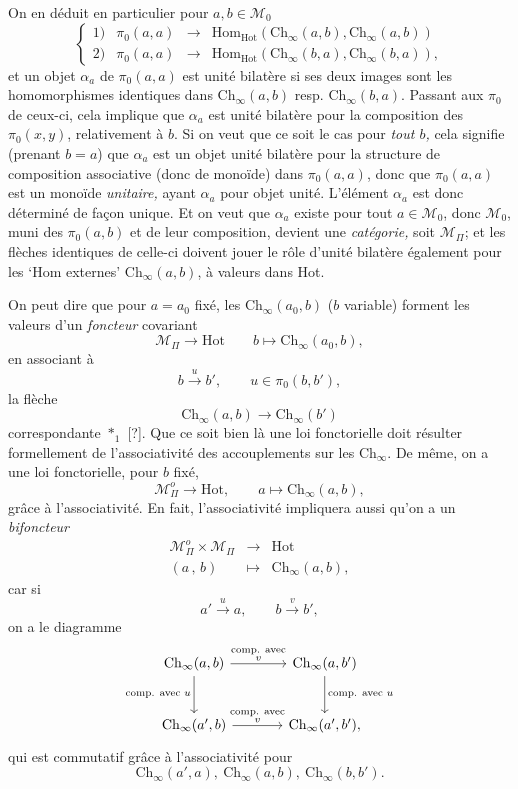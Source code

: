 \documentclass[11pt]{article}
\newcommand{\printedpage}[1]{\marginpar{\footnotesize p.~#1}}
\newcommand{\msp}[1]{\marginpar{\footnotesize [#1]}}
\newcommand{\Ch}{\mathrm{Ch}}
\newcommand{\Hot}{\mathrm{Hot}}
\newcommand{\Hom}{\mathrm{Hom}}
\begin{document}
On en déduit en particulier pour $a,b \in \mathcal{M}_0$
\[
\left\{
\begin{array}{cccc}
1) & \pi_0(a,a) & \longrightarrow & \Hom_{\Hot}(\Ch_\infty(a,b),\Ch_\infty(a,b)) \\[1ex]
2) & \pi_0(a,a) & \longrightarrow & \Hom_{\Hot}(\Ch_\infty(b,a),\Ch_\infty(b,a)),
\end{array}
\right.
\tag*{$(*)$}
\]
et un objet $\alpha_a$ de $\pi_0(a,a)$ est unité bilatère si ses deux images sont les homomorphismes identiques dans $\Ch_\infty(a,b)$ resp. $\Ch_\infty(b,a)$. Passant aux $\pi_0$ de ceux-ci, cela implique que $\alpha_a$ est unité bilatère pour la composition des $\pi_0(x,y)$, relativement à $b$. Si on veut que ce soit le cas pour \textit{tout $b$,} cela signifie (prenant $b = a$) que $\alpha_a$ est un objet unité bilatère pour la structure de composition associative (donc de monoïde) dans $\pi_0(a,a)$, donc que $\pi_0(a,a)$ est un monoïde \textit{unitaire,} ayant $\alpha_a$ pour objet unité. L'élément $\alpha_a$ est donc déterminé de façon unique. Et on veut que $\alpha_a$ existe
\msp{page 3}
pour tout $a \in \mathcal{M}_0$, donc $\mathcal{M}_0$, muni des $\pi_0(a,b)$ et de leur composition, devient une \textit{catégorie,} soit $\mathcal{M}_\Pi$; et les flèches identiques de celle-ci doivent jouer le rôle d'unité bilatère également pour les `Hom externes' $\Ch_\infty(a,b)$, à valeurs dans Hot.

On peut dire que pour $a = a_0$ fixé, les $\Ch_\infty(a_0,b)$ ($b$ variable) forment les valeurs d'un \textit{foncteur} covariant
\[
\mathcal{M}_\Pi \longrightarrow \Hot \qquad b \longmapsto \Ch_\infty(a_0,b),
\]
en associant à
\[
b \xrightarrow{\ u\ } b', \qquad u \in \pi_0(b,b'),
\]
la flèche
\[
\Ch_\infty(a,b) \longrightarrow \Ch_\infty(b') %
\]
 correspondante $*_1$ [?]. Que ce soit bien là une loi fonctorielle doit résulter formellement de l'associativité des accouplements sur les $\Ch_\infty$. De même, on a une loi fonctorielle, pour $b$ fixé,
\[
\mathcal{M}^o_\Pi \longrightarrow \Hot, \qquad a \longmapsto \Ch_\infty(a,b),
\]
grâce à l'associativité. En fait, l'associativité impliquera aussi qu'on a un \textit{bifoncteur}
\[
\begin{array}{ccc}
\mathcal{M}^o_\Pi \times \mathcal{M}_\Pi & \longrightarrow & \Hot \\[1ex]
(a\,,\,b) & \longmapsto & \Ch_\infty(a,b),
\end{array}
\]
\printedpage{3}
\msp{page 4}
car si
\[
a' \xrightarrow{\ u\ } a, \qquad b \xrightarrow{\ v\ } b',
\]
on a le diagramme
\[
\begin{tikzcd}[column sep=large, row sep=large]
\Ch_\infty(a,b) \arrow[r, "\substack{\text{comp. avec}\\ v}"] \arrow[d, "\text{comp. avec } u"'] & \Ch_\infty(a,b') \arrow[d, "\text{comp. avec } u"] \\
\Ch_\infty(a',b) \arrow[r, "\substack{\text{comp. avec}\\ v}"] & \Ch_\infty(a',b'),
\end{tikzcd}
\]
qui est commutatif grâce à l'associativité pour
\[
\Ch_\infty(a',a),\ \Ch_\infty(a,b),\ \Ch_\infty(b,b').
\]
\end{document}
